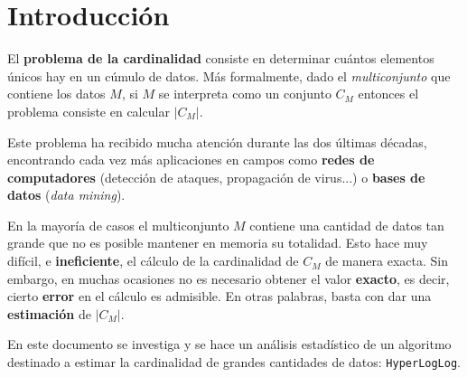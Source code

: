 % 
\section{Introducción}

El \textbf{problema de la cardinalidad} consiste en determinar cuántos elementos únicos hay en un cúmulo de
datos. Más formalmente, dado el \emph{multiconjunto} que contiene los datos $M$, si $M$ se interpreta como
un conjunto $C_M$ entonces el problema consiste en calcular $|C_M|$.

Este problema ha recibido mucha atención durante las dos últimas décadas, encontrando cada vez más
aplicaciones en campos como \textbf{redes de computadores} (detección de ataques, propagación de virus...) o
\textbf{bases de datos} (\emph{data mining}).

En la mayoría de casos el multiconjunto $M$ contiene una cantidad de datos tan grande que no es
posible mantener en memoria su totalidad. Esto hace muy difícil, e \textbf{ineficiente}, el cálculo de la
cardinalidad de $C_M$ de manera exacta. Sin embargo, en muchas ocasiones no es necesario obtener el valor
\textbf{exacto}, es decir, cierto \textbf{error} en el cálculo es admisible. En otras palabras, basta con dar una
\textbf{estimación} de $|C_M|$.

En este documento se investiga y se hace un análisis estadístico de un algoritmo destinado a estimar la
cardinalidad de grandes cantidades de datos: \texttt{HyperLogLog}.
